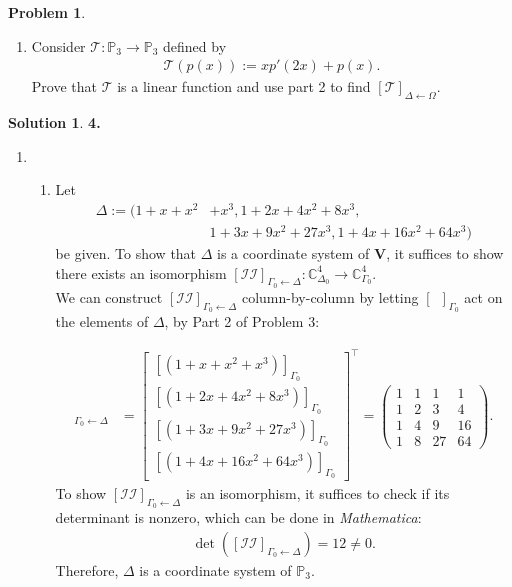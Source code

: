 \documentclass{article}
\theoremstyle{definition}
\newtheorem*{prob*}{Problem}
\newtheorem*{sln*}{Solution}
\newcommand{\V}{\mathbf{V}}
\begin{document}
\begin{prob*}
\begin{enumerate}
	
	\item Consider $\mathcal{T} : \mathbb{P}_3 \rightarrow \mathbb{P}_3$ defined by 
	\begin{align*}
	\mathcal{T}(p(x)) := xp'(2x) + p(x).
	\end{align*}
	Prove that $\mathcal{T}$ is a linear function and use part 2 to find $[\mathcal{T}]_{\Delta\leftarrow \Omega}$.
	
	
	\end{enumerate}



	\begin{sln*}\textbf{4.}
		$\,$
		\begin{enumerate}
			\item 
			\begin{enumerate}
				\item Let 
				\begin{align*}
				\Delta := (1 + x + x^2 &+ x^3, 1 + 2x+4x^2 + 8x^3,\\
				&1 + 3x+9x^2 + 27x^3, 1+ 4x +16x^2 + 64x^3)
				\end{align*}
				be given. To show that $\Delta$ is a coordinate system of $\V$, it suffices to show there exists an isomorphism $[\mathcal{II}]_{{\Gamma_0}\leftarrow\Delta} : \mathbb{C}^4_{\Delta_0}\to\mathbb{C}^4_{\Gamma_0}$. \\
				
				We can construct $[\mathcal{II}]_{{\Gamma_0}\leftarrow\Delta}$ column-by-column by letting $[\,\,\,]_{\Gamma_0}$ act on the elements of $\Delta$, by Part 2 of Problem 3:
				
				\begin{align*}
				[\mathcal{II}]_{\Gamma_0\leftarrow\Delta}
				&= \begin{bmatrix}
				[(1+x+x^2+x^3)]_{\Gamma_0}\\
				[(1+2x+4x^2+8x^3)]_{\Gamma_0} \\ 
				[(1+3x+9x^2+27x^3)]_{\Gamma_0} \\ 
				[(1+4x+16x^2+64x^3)]_{\Gamma_0}
				\end{bmatrix}^\top
				= \begin{pmatrix}
				1&1&1&1\\
				1&2&3&4\\
				1&4&9&16\\
				1&8&27&64
				\end{pmatrix}.
				\end{align*} 
				To show $[\mathcal{II}]_{\Gamma_0\leftarrow\Delta}$ is an isomorphism, it suffices to check if its determinant is nonzero, which can be done in \textit{Mathematica}:
				\begin{align*}
				\det\left([\mathcal{II}]_{\Gamma_0\leftarrow\Delta}\right) = 12 \neq 0.
				\end{align*}
				Therefore, $\Delta$ is a coordinate system of $\mathbb{P}_3$.\\
				

\end{enumerate}
\end{enumerate}
\end{sln*}
\end{prob*}
\end{document}
